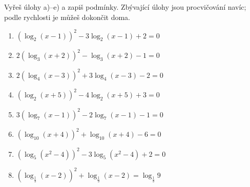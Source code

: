 \documentclass[11pt,a4paper]{article}
\begin{document}
Vyřeš úlohy a)--e) a zapiš podmínky. Zbývající úlohy jsou procvičování navíc; podle rychlosti je můžeš dokončit doma. 
\begin{zadaniBox}[title={Domácí úkol}]
\begin{enumerate}[label=\alph*)]
\item $\displaystyle (\log_2(x-1))^2-3\log_2(x-1)+2=0$
\item $\displaystyle 2(\log_3(x+2))^2-\log_3(x+2)-1=0$
\item $\displaystyle 2(\log_4(x-3))^2+3\log_4(x-3)-2=0$
\item $\displaystyle (\log_2(x+5))^2-4\log_2(x+5)+3=0$
\item $\displaystyle 3(\log_7(x-1))^2-2\log_7(x-1)-1=0$
\item $\displaystyle (\log_{10}(x+4))^2+\log_{10}(x+4)-6=0$
\item $\displaystyle (\log_5(x^2-4))^2-3\log_5(x^2-4)+2=0$
\item $\displaystyle (\log_{\frac13}(x-2))^2+\log_{\frac13}(x-2)=\log_{\frac13}9$
\end{enumerate}
\end{zadaniBox}
\end{document}
